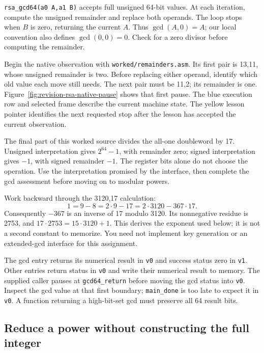 

\texttt{rsa\_gcd64(a0 A,a1 B)} accepts full unsigned 64-bit values.
At each iteration, compute the unsigned remainder and replace both operands.
The loop stops when $B$ is zero, returning the current $A$. Thus
$\gcd(A,0)=A$; our local convention also defines $\gcd(0,0)=0$.
Check for a zero divisor before computing the remainder.

Begin the native observation with \texttt{worked/remainders.asm}. Its first
pair is 13,11, whose unsigned remainder is two. Before replacing either operand,
identify which old value each move still needs. The next pair must be 11,2;
its remainder is one. Figure~\ref{fig:revision-rsa-native-pause} shows that first
pause. The blue execution row and selected frame describe the current machine
state. The yellow lesson pointer identifies the next requested stop after the
lesson has accepted the current observation.



The final part of this worked source divides the all-one doubleword by 17.
Unsigned interpretation gives $2^{64}-1$, with remainder zero; signed
interpretation gives $-1$, with signed remainder $-1$. The register bits alone
do not choose the operation. Use the interpretation promised by the interface,
then complete the gcd assessment before moving on to modular powers.

Work backward through the 3120,17 calculation:
\[
  1=9-8=2\cdot9-17=2\cdot3120-367\cdot17.
\]
Consequently $-367$ is an inverse of 17 modulo 3120. Its nonnegative residue is
2753, and $17\cdot2753=15\cdot3120+1$. This derives the exponent used below;
it is not a second constant to memorize. You need not implement key generation
or an extended-gcd interface for this assignment.

The gcd entry returns its numerical result in \texttt{v0} and success status
zero in \texttt{v1}. Other entries return status in \texttt{v0} and write their
numerical result to memory. The supplied caller pauses at \texttt{gcd64\_return}
before moving the gcd status into \texttt{v0}. Inspect the gcd value at that
first boundary; \texttt{main\_done} is too late to expect it in \texttt{v0}.
A function returning a high-bit-set gcd must preserve all 64 result bits.

\subsection*{Reduce a power without constructing the full integer}

